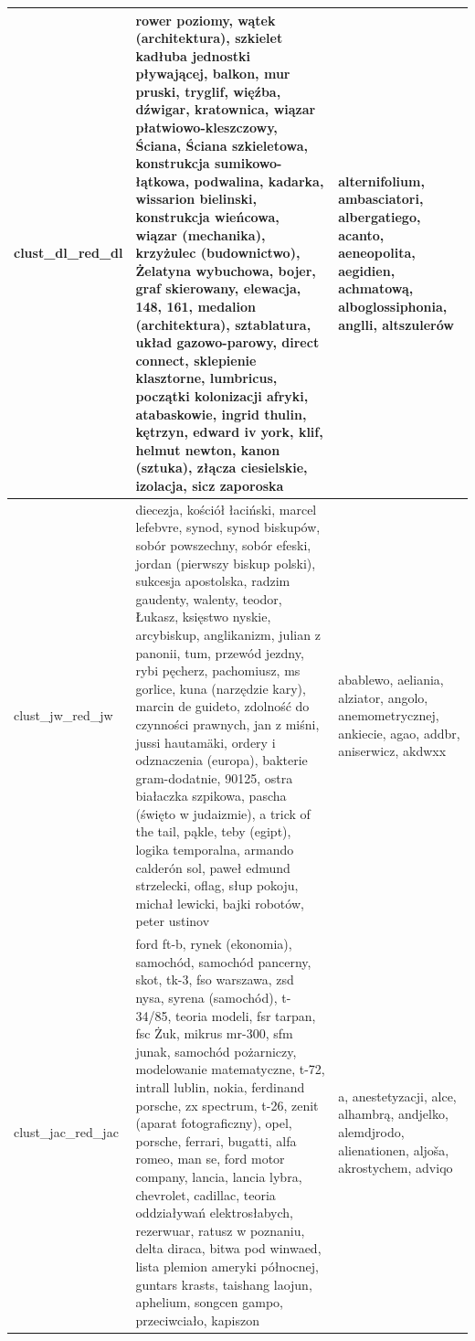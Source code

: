 \documentclass{praca1}
\begin{document}
\begin{table}[ht]
\begin{tabular}{lll}
   \hline
clust\_dl\_red\_dl & rower poziomy, wątek (architektura), szkielet kadłuba jednostki pływającej, balkon, mur pruski, tryglif, więźba, dźwigar, kratownica, wiązar płatwiowo-kleszczowy, Ściana, Ściana szkieletowa, konstrukcja sumikowo-łątkowa, podwalina, kadarka, wissarion bielinski, konstrukcja wieńcowa, wiązar (mechanika), krzyżulec (budownictwo), Żelatyna wybuchowa, bojer, graf skierowany, elewacja, 148, 161, medalion (architektura), sztablatura, układ gazowo-parowy, direct connect, sklepienie klasztorne, lumbricus, początki kolonizacji afryki, atabaskowie, ingrid thulin, kętrzyn, edward iv york, klif, helmut newton, kanon (sztuka), złącza ciesielskie, izolacja, sicz zaporoska & alternifolium, ambasciatori, albergatiego, acanto, aeneopolita, aegidien, achmatową, alboglossiphonia, anglli, altszulerów \\ 
   \hline
clust\_jw\_red\_jw & diecezja, kościół łaciński, marcel lefebvre, synod, synod biskupów, sobór powszechny, sobór efeski, jordan (pierwszy biskup polski), sukcesja apostolska, radzim gaudenty, walenty, teodor, Łukasz, księstwo nyskie, arcybiskup, anglikanizm, julian z panonii, tum, przewód jezdny, rybi pęcherz, pachomiusz, ms gorlice, kuna (narzędzie kary), marcin de guideto, zdolność do czynności prawnych, jan z miśni, jussi hautamäki, ordery i odznaczenia (europa), bakterie gram-dodatnie, 90125, ostra białaczka szpikowa, pascha (święto w judaizmie), a trick of the tail, pąkle, teby (egipt), logika temporalna, armando calderón sol, paweł edmund strzelecki, oflag, słup pokoju, michał lewicki, bajki robotów, peter ustinov & abablewo, aeliania, alziator, angolo, anemometrycznej, ankiecie, agao, addbr, aniserwicz, akdwxx \\ 
   \hline
clust\_jac\_red\_jac & ford ft-b, rynek (ekonomia), samochód, samochód pancerny, skot, tk-3, fso warszawa, zsd nysa, syrena (samochód), t-34/85, teoria modeli, fsr tarpan, fsc Żuk, mikrus mr-300, sfm junak, samochód pożarniczy, modelowanie matematyczne, t-72, intrall lublin, nokia, ferdinand porsche, zx spectrum, t-26, zenit (aparat fotograficzny), opel, porsche, ferrari, bugatti, alfa romeo, man se, ford motor company, lancia, lancia lybra, chevrolet, cadillac, teoria oddziaływań elektrosłabych, rezerwuar, ratusz w poznaniu, delta diraca, bitwa pod winwaed, lista plemion ameryki północnej, guntars krasts, taishang laojun, aphelium, songcen gampo, przeciwciało, kapiszon & a, anestetyzacji, alce, alhambrą, andjelko, alemdjrodo, alienationen, aljoša, akrostychem, adviqo \\ 
   \hline

\end{tabular}
\end{table}
\end{document}
